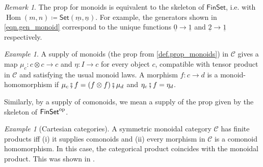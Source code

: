 \documentclass[11pt, oneside, article]{memoir}
\theoremstyle{plain}
\theoremstyle{definition}
\theoremstyle{remark}
\newtheorem{example}[theorem]{Example}
\newtheorem{remark}[theorem]{Remark}
\newcommand{\ord}[1]{\underline{#1}}%
\newcommand{\cat}[1]{\mathcal{#1}}%
\newcommand{\Cat}[1]{{\mathsf{#1}}}%
\DeclareMathOperator{\Hom}{Hom}
\newcommand{\tn}[1]{\textnormal{#1}}
\newcommand{\op}{^{\tn{op}}}
\newcommand{\finset}{\Cat{FinSet}}
\newcommand{\smset}{\Cat{Set}}
\newcommand{\cp}{\mathbin{\fatsemi}}
\begin{document}
\begin{remark}
The prop for monoids is equivalent to the skeleton of $\finset$, i.e. with $\Hom(m,n)\coloneqq\smset(\ord{m},\ord{n})$. For example, the generators shown in \cref{eqn.gen_monoid} correspond to the unique functions $\ord{0}\to\ord{1}$ and $\ord{2}\to\ord{1}$ respectively.
\end{remark}

\begin{example}
 A supply of monoids (the prop from \cref{def.prop_monoids}) in $\cat{C}$ gives a map $\mu_c\colon c\otimes c\to c$ and $\eta\colon I\to c$ for every object $c$, compatible with tensor product in $\cat{C}$ and satisfying the usual monoid laws. A morphism $f\colon c\to d$ is a monoid-homomorphism if $\mu_c\cp f=(f\otimes f)\cp \mu_d$ and $\eta_c\cp f=\eta_d$.

Similarly, by a supply of comonoids, we mean a supply of the prop given by the skeleton of $\finset\op$.
\end{example}

\begin{example}[Cartesian categories]\label{ex.cart_grant_comonoids}
A symmetric monoidal category $\cat{C}$ has finite products iff (i) it supplies comonoids and (ii) every morphism in $\cat{C}$ is a comonoid homomorphism. In this case, the categorical product coincides with the monoidal product. This was shown in \cite{fox1976coalgebras}.
\end{example}
\end{document}
